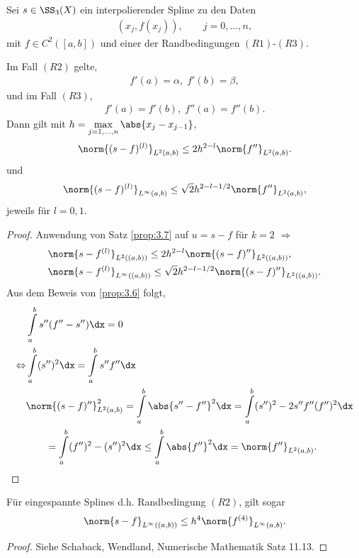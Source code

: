 \begin{prop}
\label{prop:3.8}
Sei $s\in\SS_3(X)$ ein interpolierender Spline zu den Daten
\begin{align*}
(x_j,f(x_j)),\qquad j=0,\ldots,n, 
\end{align*}
mit $f\in C^2([a,b])$ und einer der Randbedingungen
$(R1)$-$(R3)$.

Im Fall $(R2)$ gelte,
\begin{align*}
f'(a) = \alpha,\; f'(b) = \beta,
\end{align*}
und im Fall $(R3)$,
\begin{align*}
f'(a) = f'(b),\; f''(a) = f''(b).
\end{align*}
Dann gilt mit $h=\max\limits_{j=1,\ldots,n} \abs{x_j-x_{j-1}}$,
\begin{align*}
\norm{(s-f)^{(l)}}_{L^2(a,b)} \le 2h^{2-l}\norm{f''}_{L^2(a,b)}.
\end{align*}
und
\begin{align*}
\norm{(s-f)^{(l)}}_{L^\infty(a,b)} \le \sqrt{2}h^{2-l-1/2}
\norm{f''}_{L^2(a,b)},
\end{align*}
jeweils für $l=0,1$.\fishhere
\end{prop}
\begin{proof}
Anwendung von Satz \ref{prop:3.7} auf $u=s-f$ für $k=2$ $\Rightarrow$
\begin{align*}
&\norm{s-f^{(l)}}_{L^2((a,b))} \le 2h^{2-l}\norm{(s-f)''}_{L^2((a,b))},\\
&\norm{s-f^{(l)}}_{L^\infty((a,b))} \le
\sqrt{2}h^{2-l-1/2}\norm{(s-f)''}_{L^2((a,b))}.
\end{align*}
Aus dem Beweis von \ref{prop:3.6} folgt,
\begin{align*}
&\int\limits_a^b s''(f''-s'')\dx = 0\\
\Leftrightarrow &
\int\limits_a^b (s'')^2\dx = \int\limits_a^b s''f''\dx\\
&\norm{(s-f)''}_{L^2(a,b)}^2 = \int\limits_a^b \abs{s''-f''}^2\dx
= \int\limits_a^b (s'')^2 - 2s''f'' (f'')^2\dx\\
&\qquad= \int\limits_a^b (f'')^2 - (s'')^2\dx
\le \int\limits_a^b \abs{f''}^2\dx  = \norm{f''}_{L^2(a,b)}.\qedhere
\end{align*}
\end{proof}
\begin{bemn}
Für eingespannte Splines d.h. Randbedingung $(R2)$, gilt sogar
\begin{align*}
\norm{s-f}_{L^\infty((a,b))} \le h^4\norm{f^{(4)}}_{L^\infty(a,b)}.
\end{align*}
\begin{proof}
Siehe Schaback, Wendland, Numerische Mathematik Satz 11.13.\qedhere\maphere
\end{proof}
\end{bemn}

